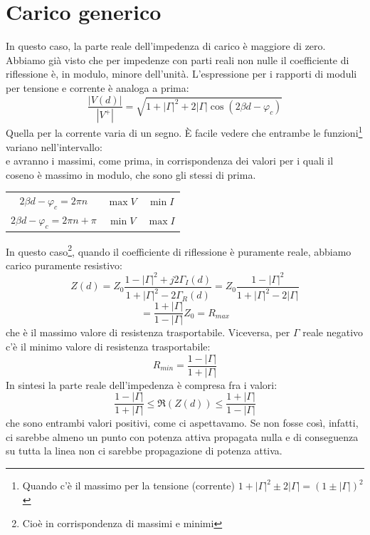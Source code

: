 \documentclass{book}
\begin{document}
    \section*{Carico generico}
        In questo caso, la parte reale dell'impedenza di carico è maggiore di zero. Abbiamo già visto che 
        per impedenze con parti reali non nulle il coefficiente di riflessione è, in modulo, minore dell'unità. 
        L'espressione per i rapporti di moduli per tensione e corrente è analoga a prima:
        \begin{equation}
            \frac{|V(d)|}{|V^{+}|} = \sqrt{1+|\Gamma|^{2}+2|\Gamma|\cos(2\beta d - \varphi_{c})}
        \end{equation}
        Quella per la corrente varia di un segno. È facile vedere che entrambe le funzioni\footnote{Quando c'è il massimo per la tensione (corrente) $1+|\Gamma|^{2}\pm2|\Gamma| = (1 \pm |\Gamma|)^{2}$} variano nell'intervallo:
        \begin{equation}
            [1-|\Gamma|, 1+|\Gamma|]
        \end{equation}
        e avranno i massimi, come prima, in corrispondenza dei valori per i quali il coseno è massimo in modulo, che sono gli stessi
        di prima. \\
        \begin{center}
        \begin{tabular}{c|c|c} 
            $2 \beta d - \varphi_{c}=2\pi n$ & $\max V$ & $\min I$ \\
            $2\beta d - \varphi_{c}=2 \pi n + \pi$ & $\min V$ & $\max I$
        \end{tabular}
        \end{center} 
        In questo caso\footnote{Cioè in corrispondenza di massimi e minimi}, quando il coefficiente di riflessione è puramente reale, abbiamo carico puramente 
        resistivo:
        \begin{equation}
            Z(d) = Z_{0} \frac{1-|\Gamma|^{2}+j2\Gamma_{I}(d)}{1+|\Gamma|^{2}-2 \Gamma_{R}(d)} = Z_{0}\frac{1-|\Gamma|^{2}}{1+|\Gamma|^{2}-2|\Gamma|}
        \end{equation}
        \begin{equation}
            = \frac{1+|\Gamma|}{1-|\Gamma|}Z_{0} = R_{max}
        \end{equation}
        che è il massimo valore di resistenza trasportabile. Viceversa, per $\Gamma$ reale negativo c'è il minimo valore di resistenza trasportabile:
        \begin{equation}
            R_{min}=\frac{1-|\Gamma|}{1+|\Gamma|}
        \end{equation}
        In sintesi la parte reale dell'impedenza è compresa fra i valori:
        \begin{equation}
            \frac{1-|\Gamma|}{1+|\Gamma|} \leq \Re(Z(d)) \leq \frac{1+|\Gamma|}{1-|\Gamma|} 
        \end{equation}
        che sono entrambi valori positivi, come ci aspettavamo. Se non fosse così, infatti, ci sarebbe almeno un punto con potenza attiva propagata nulla e di
        conseguenza su tutta la linea non ci sarebbe propagazione di potenza attiva.
        
\end{document}
